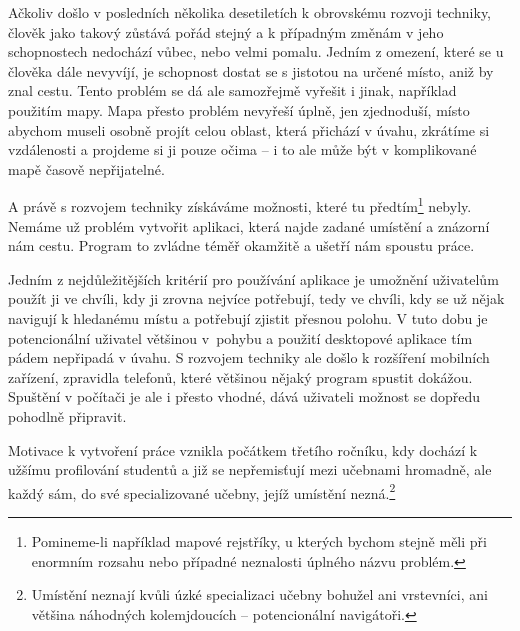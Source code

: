 Ačkoliv došlo v posledních několika desetiletích k obrovskému rozvoji techniky, člověk jako takový zůstává pořád stejný a k případným změnám v jeho schopnostech nedochází vůbec, nebo velmi pomalu. Jedním z omezení, které se u člověka dále nevyvíjí, je schopnost dostat se s jistotou na určené místo, aniž by znal cestu. Tento problém se dá ale samozřejmě vyřešit i jinak, například použitím mapy. Mapa přesto problém nevyřeší úplně, jen zjednoduší, místo abychom museli osobně projít celou oblast, která přichází v úvahu, zkrátíme si vzdálenosti a projdeme si ji pouze očima -- i to ale může být v komplikované mapě časově nepřijatelné.

A právě s rozvojem techniky získáváme možnosti, které tu předtím\footnote{Pomineme-li například mapové rejstříky, u kterých bychom stejně měli při enormním rozsahu nebo případné neznalosti úplného názvu problém.} nebyly. Nemáme už problém vytvořit aplikaci, která najde zadané umístění a znázorní nám cestu. Program to zvládne téměř okamžitě a ušetří nám spoustu práce.

Jedním z nejdůležitějších kritérií pro používání aplikace je umožnění uživatelům použít ji ve chvíli, kdy ji zrovna nejvíce potřebují, tedy ve chvíli, kdy se už nějak navigují k hledanému místu a potřebují zjistit přesnou polohu. V tuto dobu je potencionální uživatel většinou v~pohybu a použití desktopové aplikace tím pádem nepřipadá v úvahu. S rozvojem techniky ale došlo k rozšíření mobilních zařízení, zpravidla telefonů, které většinou nějaký program spustit dokážou. Spuštění v počítači je ale i přesto vhodné, dává uživateli možnost se dopředu pohodlně připravit.

Motivace k vytvoření práce vznikla počátkem třetího ročníku, kdy dochází k užšímu profilování studentů a již se nepřemisťují mezi učebnami hromadně, ale každý sám, do své specializované učebny, jejíž umístění nezná.\footnote{Umístění neznají kvůli úzké specializaci učebny bohužel ani vrstevníci, ani většina náhodných kolemjdoucích -- potencionální navigátoři.}
